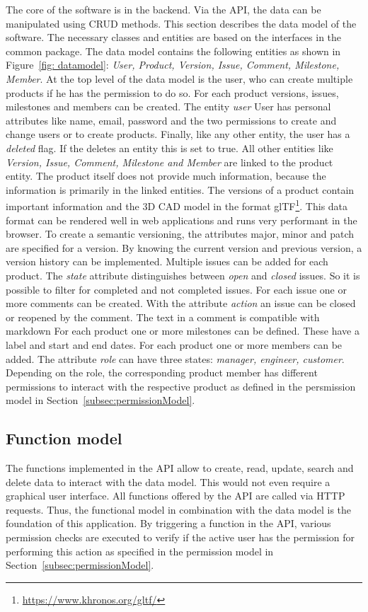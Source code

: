     The core of the software is in the backend. Via the API, the data can be manipulated using CRUD methods. This section describes the data model of the software. The necessary classes and entities are based on the interfaces in the common package.
    The data model contains the following entities as shown in Figure~\ref{fig: datamodel}: \textit{User, Product, Version, Issue, Comment, Milestone, Member}. At the top level of the data model is the user, who can create multiple products if he has the permission to do so. For each product versions, issues, milestones and members can be created. The entity \textit{user} User has personal attributes like name, email, password and the two permissions to create and change users or to create products. Finally, like any other entity, the user has a \textit{deleted} flag. If the deletes an entity this is set to true. All other entities like \textit{Version, Issue, Comment, Milestone and Member} are linked to the product entity. The product itself does not provide much information, because the information is primarily in the linked entities. The versions of a product contain important information and the 3D CAD model in the format glTF\footnote{\url{https://www.khronos.org/gltf/}}. This data format can be rendered well in web applications and runs very performant in the browser.  To create a semantic versioning, the attributes major, minor and patch are specified for a version. By knowing the current version and previous version, a version history can be implemented. Multiple issues can be added for each product. The \textit{state} attribute distinguishes between \textit{open} and \textit{closed} issues. So it is possible to filter for completed and not completed issues. For each issue one or more comments can be created. With the attribute \textit{action} an issue can be closed or reopened by the comment. The text in a comment is compatible with markdown
    For each product one or more milestones can be defined. These have a label and start and end dates. For each product one or more members can be added. The attribute \textit{role} can have three states: \textit{manager, engineer, customer}. Depending on the role, the corresponding product member has different permissions to interact with the respective product  as defined in the persmission model in Section~\ref{subsec:permissionModel}. 

    \subsection*{Function model} 
    The functions implemented in the API allow to create, read, update, search and delete data to interact with the data model. This would not even require a graphical user interface. All functions offered by the API are called via HTTP requests. Thus, the functional model in combination with the data model is the foundation of this application. 
    By triggering a function in the API, various permission checks are executed to verify if the active user has the permission for performing this action as specified in the permission model in Section~\ref{subsec:permissionModel}. 

